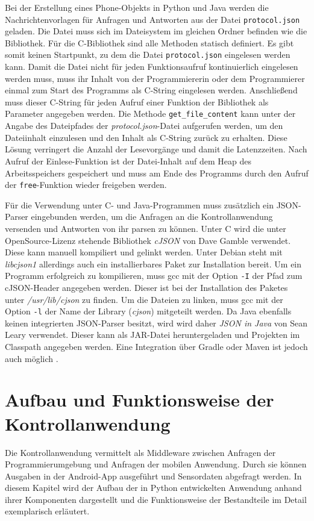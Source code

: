\documentclass[11pt,a4paper]{report}
\begin{document}
Bei der Erstellung eines Phone-Objekts in Python und Java werden die Nachrichtenvorlagen für Anfragen und Antworten aus der Datei \texttt{protocol.json} geladen.
Die Datei muss sich im Dateisystem im gleichen Ordner befinden wie die Bibliothek.
Für die C-Bibliothek sind alle Methoden statisch definiert.
Es gibt somit keinen Startpunkt, zu dem die Datei \texttt{protocol.json} eingelesen werden kann.
Damit die Datei nicht für jeden Funktionsaufruf kontinuierlich eingelesen werden muss, muss ihr Inhalt von der Programmiererin oder dem Programmierer einmal zum Start des Programms als C-String eingelesen werden.
Anschließend muss dieser C-String für jeden Aufruf einer Funktion der Bibliothek als Parameter angegeben werden.
Die Methode \texttt{get\_file\_content} kann unter der Angabe des Dateipfades der \textit{protocol.json}-Datei aufgerufen werden, um den Dateiinhalt einzulesen und den Inhalt als C-String zurück zu erhalten.
Diese Lösung verringert die Anzahl der Lesevorgänge und damit die Latenzzeiten.
Nach Aufruf der Einlese-Funktion ist der Datei-Inhalt auf dem Heap des Arbeitsspeichers gespeichert und muss am Ende des Programms durch den Aufruf der \texttt{free}-Funktion wieder freigeben werden. 

Für die Verwendung unter C- und Java-Programmen muss zusätzlich ein JSON-Parser eingebunden werden, um die Anfragen an die Kontrollanwendung versenden und Antworten von ihr parsen zu können.
Unter C wird die unter OpenSource-Lizenz stehende Bibliothek \textit{cJSON} von Dave Gamble \cite{cjson} verwendet.
Diese kann manuell kompiliert und gelinkt werden.
Unter Debian steht mit \textit{libcjson1} \cite{cjson-package} allerdings auch ein installierbares Paket zur Installation bereit.
Um ein Programm erfolgreich zu kompilieren, muss gcc mit der Option \texttt{-I} der Pfad zum cJSON-Header angegeben werden.
Dieser ist bei der Installation des Paketes unter \textit{/usr/lib/cjson} zu finden.
Um die Dateien zu linken, muss gcc mit der Option \texttt{-l} der Name der Library (\textit{cjson}) mitgeteilt werden.
Da Java ebenfalls keinen integrierten JSON-Parser besitzt, wird wird daher \textit{JSON in Java} \cite{json_java} von Sean Leary verwendet.
Dieser kann als JAR-Datei heruntergeladen und Projekten im Classpath angegeben werden.
Eine Integration über Gradle oder Maven ist jedoch auch möglich \cite{json_java_maven}.

\chapter{Aufbau und Funktionsweise der Kontrollanwendung}\label{chap:server_software}
Die Kontrollanwendung vermittelt als Middleware zwischen Anfragen der Programmierumgebung und Anfragen der mobilen Anwendung.
Durch sie können Ausgaben in der Android-App ausgeführt und Sensordaten abgefragt werden.
In diesem Kapitel wird der Aufbau der in Python entwickelten Anwendung anhand ihrer Komponenten dargestellt und die Funktionsweise der Bestandteile im Detail exemplarisch erläutert.
\end{document}
